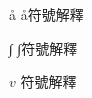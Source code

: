 
\begin{denotation}[3cm]

\item[å]{
  å符號解釋
}

\item[∫]{
  ∫符號解釋
}

\item[$v$]{
  符號解釋
}

\end{denotation}
